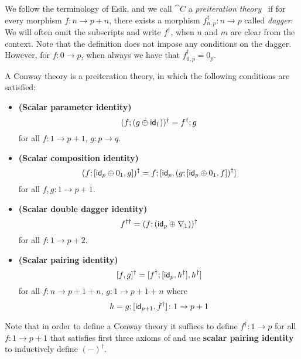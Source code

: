 We follow the terminology of Esik, and we call $\cat{C}$ a \emph{preiteration theory}~\cite{Esik:1999:Group} if for every morphism $f \colon n \to p + n$, there exists a morphism $f^\dagger_{n,p} \colon n \to p$ called \emph{dagger}. We will often omit the subscripts and write $f^\dagger$, when $n$ and $m$ are clear from the context. Note that the definition does not impose any conditions on the dagger. However, for $f \colon 0 \to p$, when always we have that $f_{0,p}^\dagger = 0_p$.
 
 
 
\begin{definition}\label{def:conway_theory}
	A Conway theory is a preiteration theory, in which the following conditions are satisfied:
	\begin{itemize}
		\item[] \textbf{(Scalar parameter identity)} $$(f ; (g \oplus \mathsf{id}_1))^\dagger = f^\dagger ; g$$ for all $f \colon 1 \to p + 1$, $g \colon p \to q$.
		\item[] \textbf{(Scalar composition identity)} 
		$$
		(f ; [ \mathsf{id}_p\oplus0_1, g ])^\dagger = f ; [ \mathsf{id}_p,  (g ;  [ \mathsf{id}_p \oplus 0_1 , f])^\dagger]
		$$ for all $f,g \colon 1 \to p + 1$.
		\item[] \textbf{(Scalar double dagger identity)} 
		$$f^{\dagger\dagger} = (f ; (\mathsf{id}_p \oplus \nabla_1))^\dagger$$
		for all $f \colon 1 \to p + 2$.
		\item[] \textbf{(Scalar pairing identity)}
		$$[ f ,g ]^\dagger = [ f^\dagger ; [ \mathsf{id}_p, h^\dagger ], h^\dagger ]$$ for all $f \colon n \to p + 1 + n $, $g \colon 1 \to p + 1 + n$ where 
		$$
		h = g ; [ \mathsf{id}_{p + 1}, f^\dagger] \colon 1 \to p + 1
		$$
	\end{itemize}
\end{definition}
\begin{remark}\label{rem:defining_dagger}
	Note that in order to define a Conway theory it suffices to define $f^\dagger \colon 1 \to p$ for all $f \colon 1 \to p + 1$ that satisfies first three axioms of  and use \textbf{scalar pairing identity} to inductively define $(-)^\dagger$.
\end{remark}

